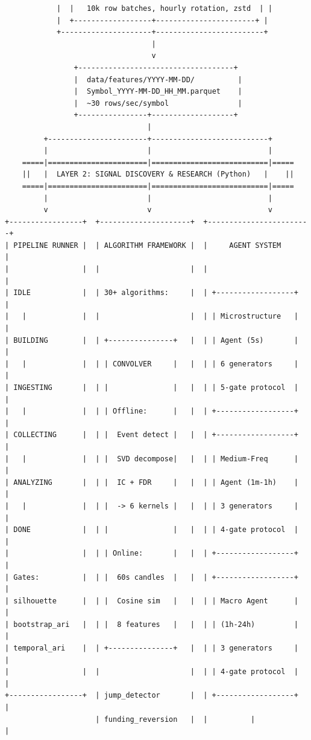 \documentclass[11pt,a4paper]{article}
\begin{document}
{\begin{verbatim}
            |  |   10k row batches, hourly rotation, zstd  | |
            |  +------------------+-----------------------+ |
            +---------------------+-------------------------+
                                  |
                                  v
                +------------------------------------+
                |  data/features/YYYY-MM-DD/          |
                |  Symbol_YYYY-MM-DD_HH_MM.parquet    |
                |  ~30 rows/sec/symbol                |
                +----------------+-------------------+
                                 |
         +-----------------------+---------------------------+
         |                       |                           |
    =====|=======================|===========================|=====
    ||   |  LAYER 2: SIGNAL DISCOVERY & RESEARCH (Python)   |    ||
    =====|=======================|===========================|=====
         |                       |                           |
         v                       v                           v
+-----------------+  +---------------------+  +------------------------+
| PIPELINE RUNNER |  | ALGORITHM FRAMEWORK |  |     AGENT SYSTEM       |
|                 |  |                     |  |                        |
| IDLE            |  | 30+ algorithms:     |  | +------------------+   |
|   |             |  |                     |  | | Microstructure   |   |
| BUILDING        |  | +---------------+   |  | | Agent (5s)       |   |
|   |             |  | | CONVOLVER     |   |  | | 6 generators     |   |
| INGESTING       |  | |               |   |  | | 5-gate protocol  |   |
|   |             |  | | Offline:      |   |  | +------------------+   |
| COLLECTING      |  | |  Event detect |   |  | +------------------+   |
|   |             |  | |  SVD decompose|   |  | | Medium-Freq      |   |
| ANALYZING       |  | |  IC + FDR     |   |  | | Agent (1m-1h)    |   |
|   |             |  | |  -> 6 kernels |   |  | | 3 generators     |   |
| DONE            |  | |               |   |  | | 4-gate protocol  |   |
|                 |  | | Online:       |   |  | +------------------+   |
| Gates:          |  | |  60s candles  |   |  | +------------------+   |
| silhouette      |  | |  Cosine sim   |   |  | | Macro Agent      |   |
| bootstrap_ari   |  | |  8 features   |   |  | | (1h-24h)         |   |
| temporal_ari    |  | +---------------+   |  | | 3 generators     |   |
|                 |  |                     |  | | 4-gate protocol  |   |
+-----------------+  | jump_detector       |  | +------------------+   |
                     | funding_reversion   |  |          |             |

\end{verbatim}}
\end{document}
